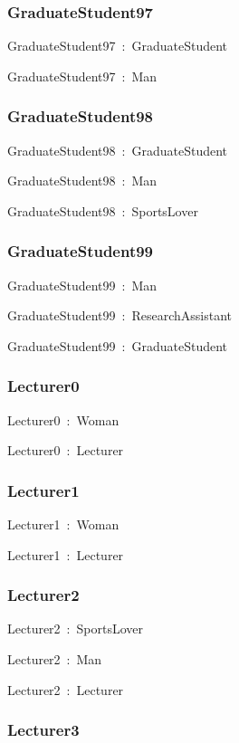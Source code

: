 \documentclass{article}
\begin{document}
\subsubsection*{GraduateStudent97}

GraduateStudent97~:~GraduateStudent

GraduateStudent97~:~Man

\subsubsection*{GraduateStudent98}

GraduateStudent98~:~GraduateStudent

GraduateStudent98~:~Man

GraduateStudent98~:~SportsLover

\subsubsection*{GraduateStudent99}

GraduateStudent99~:~Man

GraduateStudent99~:~ResearchAssistant

GraduateStudent99~:~GraduateStudent

\subsubsection*{Lecturer0}

Lecturer0~:~Woman

Lecturer0~:~Lecturer

\subsubsection*{Lecturer1}

Lecturer1~:~Woman

Lecturer1~:~Lecturer

\subsubsection*{Lecturer2}

Lecturer2~:~SportsLover

Lecturer2~:~Man

Lecturer2~:~Lecturer

\subsubsection*{Lecturer3}
\end{document}
